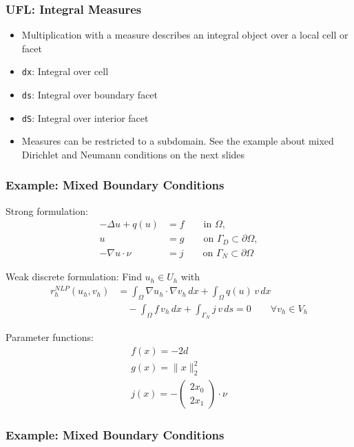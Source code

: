 \documentclass[ignorenonframetext,11pt]{beamer}
\theoremstyle{definition}
\begin{document}
\begin{frame}[fragile]
  \frametitle{UFL: Integral Measures}
  \begin{itemize}
  \item Multiplication with a measure describes an integral object over a local
    cell or facet
  \item \lstinline{dx}: Integral over cell
  \item \lstinline{ds}: Integral over boundary facet
  \item \lstinline{dS}: Integral over interior facet
  \item Measures can be restricted to a subdomain. See the example about mixed
    Dirichlet and Neumann conditions on the next slides
  \end{itemize}
\end{frame}

\begin{frame}
  \frametitle{Example: Mixed Boundary Conditions}

  Strong formulation:
  \begin{align*}
    -\Delta u + q(u) & = f \qquad\text{in $\Omega$}, \\
    u &= g \qquad\text{on $\Gamma_D\subset\partial\Omega$}, \\
    -\nabla u \cdot \nu &= j \qquad\text{on $\Gamma_N\subset\partial\Omega$}
  \end{align*}

  Weak discrete formulation: Find $u_h \in U_h$ with
  \begin{align*}
    r_h^{NLP}(u_h, v_h)
    & = \int_\Omega \nabla u_h \cdot \nabla v_h \, dx
      + \int_\Omega q(u) \, v \, dx \\
    &\quad - \int_\Omega f \, v_h \, dx
      + \int_{\Gamma_N} j \, v \, ds
      = 0 \qquad \forall v_h \in V_h
  \end{align*}

  Parameter functions:
  \begin{align*}
    f(x) = -2d \\
    g(x) = \| x \|_2^2\\
    j(x) = -
    \begin{pmatrix}
      2x_0 \\ 2x_1
    \end{pmatrix}
    \cdot \nu
  \end{align*}
\end{frame}

\begin{frame}
  \frametitle{Example: Mixed Boundary Conditions}
  
\end{frame}
\end{document}

